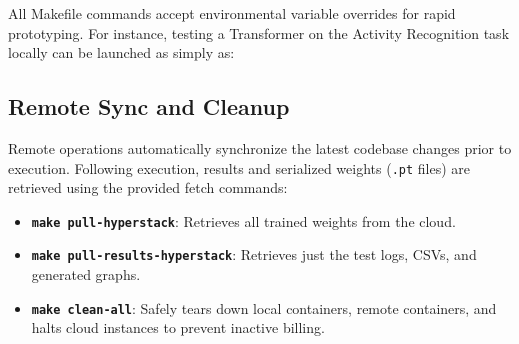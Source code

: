 All Makefile commands accept environmental variable overrides for rapid prototyping. For instance, testing a Transformer on the Activity Recognition task locally can be launched as simply as:

\vspace{2mm}
\noindent{}
\vspace{2mm}

\subsection{Remote Sync and Cleanup}
Remote operations automatically synchronize the latest codebase changes prior to execution. Following execution, results and serialized weights (\texttt{.pt} files) are retrieved using the provided fetch commands:
\begin{itemize}
    \item \textbf{\texttt{make pull-hyperstack}}: Retrieves all trained weights from the cloud.
    \item \textbf{\texttt{make pull-results-hyperstack}}: Retrieves just the test logs, CSVs, and generated graphs.
    \item \textbf{\texttt{make clean-all}}: Safely tears down local containers, remote containers, and halts cloud instances to prevent inactive billing.
\end{itemize}
